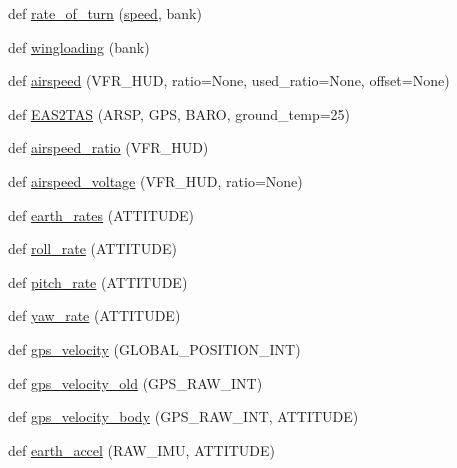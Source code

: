 \begin{DoxyCompactItemize}
\item 
def \mbox{\hyperlink{namespacepymavlink_1_1mavextra_a4d7617fb1541d638db0023fd663c59fd}{rate\+\_\+of\+\_\+turn}} (\mbox{\hyperlink{darknet_8c_a4c45f1bb571fe1f3c52c4f7b7d858f8d}{speed}}, bank)
\item 
def \mbox{\hyperlink{namespacepymavlink_1_1mavextra_abe7eb91429847abe6333b64f2fa5b39e}{wingloading}} (bank)
\item 
def \mbox{\hyperlink{namespacepymavlink_1_1mavextra_a769a373b481f0c8aa24565a18f141e66}{airspeed}} (V\+F\+R\+\_\+\+H\+UD, ratio=None, used\+\_\+ratio=None, offset=None)
\item 
def \mbox{\hyperlink{namespacepymavlink_1_1mavextra_a7d43fc6d74cca81b49d9528bfbe97193}{E\+A\+S2\+T\+AS}} (A\+R\+SP, G\+PS, B\+A\+RO, ground\+\_\+temp=25)
\item 
def \mbox{\hyperlink{namespacepymavlink_1_1mavextra_a9bc2701bc2b4da0a2e4ee303c7cecf65}{airspeed\+\_\+ratio}} (V\+F\+R\+\_\+\+H\+UD)
\item 
def \mbox{\hyperlink{namespacepymavlink_1_1mavextra_a7e374b6fd195ee7b8efbffb17cbf84b7}{airspeed\+\_\+voltage}} (V\+F\+R\+\_\+\+H\+UD, ratio=None)
\item 
def \mbox{\hyperlink{namespacepymavlink_1_1mavextra_ada9a5936b18dd8a99085b06b9b687573}{earth\+\_\+rates}} (A\+T\+T\+I\+T\+U\+DE)
\item 
def \mbox{\hyperlink{namespacepymavlink_1_1mavextra_ad1a6d8f7d2affd450da8c9a6a3d36e05}{roll\+\_\+rate}} (A\+T\+T\+I\+T\+U\+DE)
\item 
def \mbox{\hyperlink{namespacepymavlink_1_1mavextra_aee61cc54c7330f81c44bc7d477e18f3a}{pitch\+\_\+rate}} (A\+T\+T\+I\+T\+U\+DE)
\item 
def \mbox{\hyperlink{namespacepymavlink_1_1mavextra_af1b42c28fc778624954bc9bb5307fcf6}{yaw\+\_\+rate}} (A\+T\+T\+I\+T\+U\+DE)
\item 
def \mbox{\hyperlink{namespacepymavlink_1_1mavextra_a42f6635bebc5b76277d38e5dcbdd8c4f}{gps\+\_\+velocity}} (G\+L\+O\+B\+A\+L\+\_\+\+P\+O\+S\+I\+T\+I\+O\+N\+\_\+\+I\+NT)
\item 
def \mbox{\hyperlink{namespacepymavlink_1_1mavextra_aee56305fd91e4db7b5b0a35725659c1c}{gps\+\_\+velocity\+\_\+old}} (G\+P\+S\+\_\+\+R\+A\+W\+\_\+\+I\+NT)
\item 
def \mbox{\hyperlink{namespacepymavlink_1_1mavextra_aee6ba92874105e32ba57d9449475661d}{gps\+\_\+velocity\+\_\+body}} (G\+P\+S\+\_\+\+R\+A\+W\+\_\+\+I\+NT, A\+T\+T\+I\+T\+U\+DE)
\item 
def \mbox{\hyperlink{namespacepymavlink_1_1mavextra_a3c2fd630569590cbbdb6fc602eb242b4}{earth\+\_\+accel}} (R\+A\+W\+\_\+\+I\+MU, A\+T\+T\+I\+T\+U\+DE)

\end{DoxyCompactItemize}
